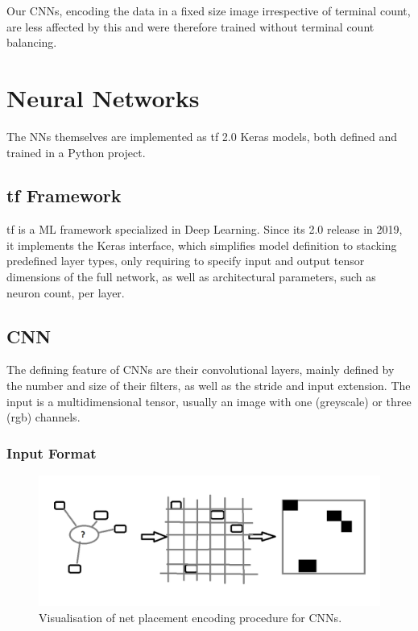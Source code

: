 Our \glspl{CNN}, encoding the data in a fixed size image irrespective of terminal count, are less affected by this and were therefore trained without terminal count balancing.

\section{Neural Networks}

The \glspl{NN} themselves are implemented as \gls{tf} 2.0 Keras models, both defined and trained in a Python project.

\subsection{\gls{tf} Framework}

\gls{tf} is a \gls{ML} framework specialized in Deep Learning.\cite{tensorflow2015-whitepaper} Since its 2.0 release in 2019, it implements the Keras interface\cite{chollet2015keras}, which simplifies model definition to stacking predefined layer types, only requiring to specify input and output tensor dimensions of the full network, as well as architectural parameters, such as neuron count, per layer.

\subsection{\gls{CNN}}

The defining feature of \glspl{CNN} are their convolutional layers, mainly defined by the number and size of their filters, as well as the stride and input extension. The input is a multidimensional tensor, usually an image with one (greyscale) or three (rgb) channels.

\subsubsection{Input Format}

\begin{figure}
	\includegraphics[width=\linewidth]{plots/cnn-encoding.png}
	\caption{Visualisation of net placement encoding procedure for \glspl{CNN}.}
	\label{fig:cnn-encoding}
\end{figure}

